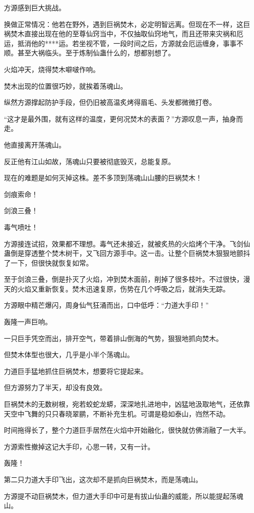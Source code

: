 \begin{this_body}
方源感到巨大挑战。

换做正常情况：他若在野外，遇到巨祸焚木，必定明智远离。但现在不一样，这巨祸焚木直接出现在他的至尊仙窍当中，不仅抽取仙窍地气，而且还带来灾祸和厄运，抵消他的****运。若坐视不管，一段时间之后，方源就会厄运缠身，事事不顺。甚至大祸临头。至于炼制仙蛊什么的，想都别想了。

火焰冲天，烧得焚木噼啵作响。

焚木出现的位置很巧妙，就挨着荡魂山。

纵然方源撑起防护手段，但仍旧被高温炙烤得眉毛、头发都微微打卷。

“这才是最外围，就有这样的温度，更何况焚木的表面？”方源叹息一声，抽身而走。

他直接离开荡魂山。

反正他有江山如故，荡魂山只要被彻底毁灭，总能复原。

现在的难题是如何灭掉这株。差不多顶到荡魂山山腰的巨祸焚木！

剑痕索命！

剑浪三叠！

毒气喷吐！

方源接连试招，效果都不理想。毒气还未接近，就被炙热的火焰烤个干净。飞剑仙蛊倒是穿透整个焚木树干，又飞回方源手中。这一击。让整个巨祸焚木狠狠地颤抖了一下，但很快就恢复如常。

至于剑浪三叠，倒是扑灭了火焰，冲到焚木面前，削掉了很多枝叶。不过很快，漫天的火焰又重新恢复。焚木迅速复原，伤势在几个呼吸之后，就消失无踪。

方源眼中精芒爆闪，周身仙气狂涌而出，口中低呼：“力道大手印！”

轰隆一声巨响。

一只巨手凭空而出，排开空气，带着排山倒海的气势，狠狠地抓向焚木。

但焚木体型也很大，几乎是小半个荡魂山。

力道巨手猛地抓住巨祸焚木，想要将它提起来。

但方源努力了半天，却没有良效。

巨祸焚木的无数树根，宛若蛟蛇龙蟒，深深地扎进地中，凶猛地汲取地气，还依靠天空中飞舞的只只春晓翠鹂，不断补充生机。可谓是稳如泰山，岿然不动。

时间拖得长了，整个力道巨手居然在火焰中开始融化，很快就仿佛消融了一大半。

方源索性撤掉这记大手印，心思一转，又有一计。

轰隆！

第二只力道大手印飞出，这次却不是抓向巨祸焚木，而是荡魂山。

方源提不动巨祸焚木，但力道大手印中可是有拔山仙蛊的威能，所以能提起荡魂山。


\end{this_body}
